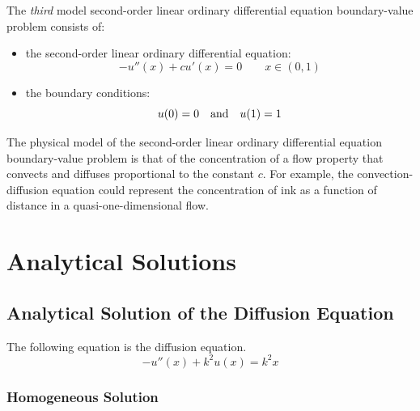 \documentclass[10pt]{article}		%
\numberwithin{equation}{section}
\begin{document}
The \textit{third} model second-order linear ordinary differential equation boundary-value problem consists of:
\begin{itemize}
	\item the second-order linear ordinary differential equation:
	\begin{equation}
	- u''(x)+cu'(x)=0 \qquad x \in (0, 1)
	\end{equation}
	\item the boundary conditions:
	\begin{equation}
	u(0) = 0 \quad \textnormal{and} \quad u(1) = 1 
	\end{equation}
\end{itemize}
The physical model of the second-order linear ordinary differential equation boundary-value problem is that of the concentration of a flow property that convects and diffuses proportional to the constant $c$. For example, the convection-diffusion equation could represent the concentration of ink as a function of distance in a quasi-one-dimensional flow.

\newpage

\section{Analytical Solutions}

\subsection{Analytical Solution of the Diffusion Equation}

The following equation is the diffusion equation.
\begin{equation}
-u''(x)+k^2u(x)=k^2x
\end{equation}

\subsubsection{Homogeneous Solution}
\end{document}
